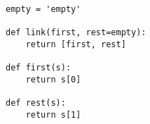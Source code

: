 \begin{lstlisting}
empty = 'empty'

def link(first, rest=empty):
    return [first, rest]

def first(s):
    return s[0]

def rest(s):
    return s[1]
\end{lstlisting}
